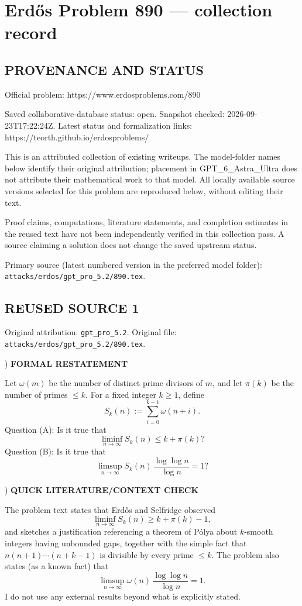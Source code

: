 \section*{Erd\H{o}s Problem 890 --- collection record}

\subsection*{PROVENANCE AND STATUS}
Official problem: https://www.erdosproblems.com/890

Saved collaborative-database status: open.
Snapshot checked: 2026-09-23T17:22:24Z.
Latest status and formalization links: https://teorth.github.io/erdosproblems/

This is an attributed collection of existing writeups. The model-folder names below identify their original attribution; placement in GPT\_6\_Astra\_Ultra does not attribute their mathematical work to that model. All locally available source versions selected for this problem are reproduced below, without editing their text.

Proof claims, computations, literature statements, and completion estimates in the reused text have not been independently verified in this collection pass. A source claiming a solution does not change the saved upstream status.

Primary source (latest numbered version in the preferred model folder): \texttt{attacks/erdos/gpt\_pro\_5.2/890.tex}.

\subsection*{REUSED SOURCE 1}
Original attribution: \texttt{gpt\_pro\_5.2}.
Original file: \texttt{attacks/erdos/gpt\_pro\_5.2/890.tex}.


) \textbf{FORMAL RESTATEMENT}

\noindent Let $\omega(m)$ be the number of distinct prime divisors of $m$, and let $\pi(k)$ be the number of primes $\le k$.
For a fixed integer $k\ge 1$, define
\[
S_k(n) := \sum_{i=0}^{k-1} \omega(n+i).
\]
Question (A): Is it true that
\[
\liminf_{n\to\infty} S_k(n) \le k + \pi(k) ?
\]
Question (B): Is it true that
\[
\limsup_{n\to\infty} S_k(n)\,\frac{\log\log n}{\log n} = 1?
\]

) \textbf{QUICK LITERATURE/CONTEXT CHECK}

\noindent The problem text states that Erd\H{o}s and Selfridge observed
\[
\liminf_{n\to\infty} S_k(n) \ge k+\pi(k)-1,
\]
and sketches a justification referencing a theorem of P\'{o}lya about $k$-smooth integers having unbounded gaps, together with the simple fact that $n(n+1)\cdots(n+k-1)$ is divisible by every prime $\le k$. The problem also states (as a known fact) that
\[
\limsup_{n\to\infty} \omega(n)\,\frac{\log\log n}{\log n} = 1.
\]
I do not use any external results beyond what is explicitly stated.

